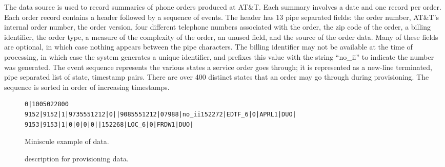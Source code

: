 The \dibbler{} data source is used to record summaries of
phone orders produced at AT\&T.  Each summary
involves a date and one record per order.
Each order record contains a header followed by a sequence of events.
The header has 13 pipe separated fields: the order number, AT\&T's
internal order number, the order version, four different telephone
numbers associated with the order, the zip code of the order, a
billing identifier, the order type, a measure of the complexity of the
order, an unused field, and the source of the order data.  Many of
these fields are optional, in which case nothing appears between the
pipe characters.  The billing identifier may not be available at the
time of processing, in which case the system generates a unique
identifier, and prefixes this value with the string ``no\_ii'' to
indicate the number was generated. The event sequence represents the
various states a service order goes through; it is represented as a
new-line terminated, pipe separated list of state, timestamp pairs.
There are over 400 distinct states that an order may go through during
provisioning.  The sequence is sorted in order of increasing timestamps. 


\begin{figure*}
\begin{small}
\begin{verbatim}
0|1005022800
9152|9152|1|9735551212|0||9085551212|07988|no_ii152272|EDTF_6|0|APRL1|DUO|
9153|9153|1|0|0|0|0||152268|LOC_6|0|FRDW1|DUO|
\end{verbatim}
\caption{Miniscule example of \dibbler{} data.}
\label{figure:dibbler-records}
\end{small}
\end{figure*}

\suppressfloats

\begin{figure}
\begin{code}

\end{code}
\caption{\datatype{} description for \dibbler{} provisioning data.}
\label{figure:dibblerml}
\end{figure}


